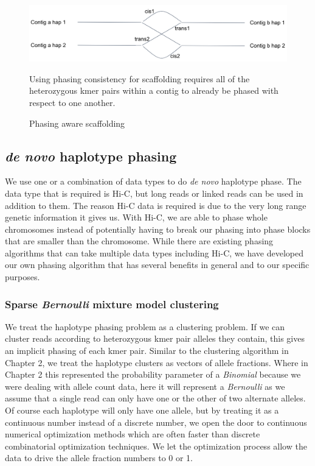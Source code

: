\begin{figure}[htbp!]
\caption{Phasing aware scaffolding}
\label{figure:scaff}
\begin{centering}
\includegraphics[width=\textwidth]{phasescaff.png}
\par{Using phasing consistency for scaffolding requires all of the heterozygous kmer pairs within a contig to already be phased with respect to one another.}
\end{centering}
\end{figure}



\subsection{\textit{de novo} haplotype phasing}

\par{
We use one or a combination of data types to do \textit{de novo} haplotype phase. The data type that is required is Hi-C, but long reads or linked reads can be used in addition to them. The reason Hi-C data is required is due to the very long range genetic information it gives us. With Hi-C, we are able to phase whole chromosomes instead of potentially having to break our phasing into phase blocks that are smaller than the chromosome. While there are existing phasing algorithms that can take multiple data types including Hi-C\cite{hapcut2}\cite{HICphasing}, we have developed our own phasing algorithm that has several benefits in general and to our specific purposes.
}

\subsubsection{Sparse \textit{Bernoulli} mixture model clustering}

\par{
We treat the haplotype phasing problem as a clustering problem. If we can cluster reads according to heterozygous kmer pair alleles they contain, this gives an implicit phasing of each kmer pair. Similar to the clustering algorithm in Chapter 2, we treat the haplotype clusters as vectors of allele fractions. Where in Chapter 2 this represented the probability parameter of a \textit{Binomial} because we were dealing with allele count data, here it will represent a \textit{Bernoulli} as we assume that a single read can only have one or the other of two alternate alleles. Of course each haplotype will only have one allele, but by treating it as a continuous number instead of a discrete number, we open the door to continuous numerical optimization methods which are often faster than discrete combinatorial optimization techniques. We let the optimization process allow the data to drive the allele fraction numbers to 0 or 1. 
}

